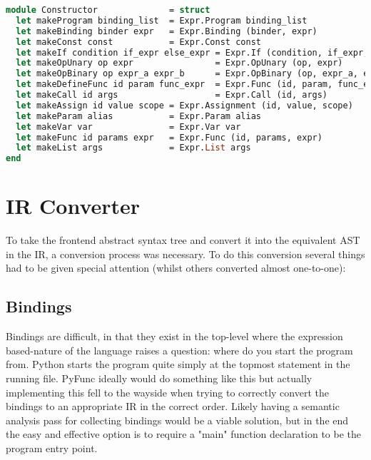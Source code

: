 \documentclass{l4proj}
\begin{document}
\begin{lstlisting}[language=Caml, keepspaces=true, caption=PyFunc frontend AST constructor functions.]
module Constructor              = struct
  let makeProgram binding_list  = Expr.Program binding_list
  let makeBinding binder expr   = Expr.Binding (binder, expr)
  let makeConst const           = Expr.Const const
  let makeIf condition if_expr else_expr = Expr.If (condition, if_expr, else_expr)
  let makeOpUnary op expr                = Expr.OpUnary (op, expr)
  let makeOpBinary op expr_a expr_b      = Expr.OpBinary (op, expr_a, expr_b)
  let makeDefineFunc id param func_expr  = Expr.Func (id, param, func_expr)
  let makeCall id args                   = Expr.Call (id, args)
  let makeAssign id value scope = Expr.Assignment (id, value, scope)
  let makeParam alias           = Expr.Param alias
  let makeVar var               = Expr.Var var
  let makeFunc id params expr   = Expr.Func (id, params, expr)
  let makeList args             = Expr.List args
end
\end{lstlisting}

\section{IR Converter}

To take the frontend abstract syntax tree and convert it into the equivalent AST in the IR, a conversion process was necessary.
To do this conversion several things had to be given special attention (whilst others converted almost one-to-one):

\subsection{Bindings}
Bindings are difficult, in that they exist in the top-level where the expression based-nature of the language raises a question: where do you start the program from.
Python starts the program quite simply at the topmost statement in the running file.
PyFunc ideally would do something like this but actually implementing this fell to the wayside when trying to correctly convert the bindings to an appropriate IR in the correct order.
Likely having a semantic analysis pass for collecting bindings would be a viable solution, but in the end the easy and effective option is to require a "main" function declaration to be the program entry point.
\end{document}
